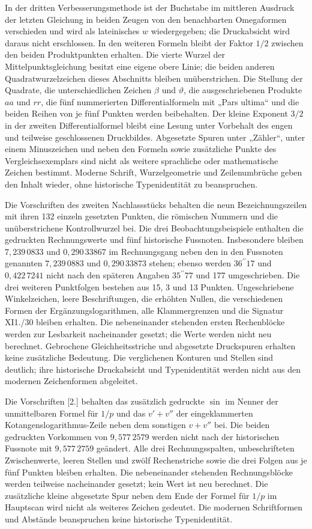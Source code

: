 In der dritten Verbesserungsmethode ist der Buchstabe im mittleren Ausdruck der letzten Gleichung in beiden Zeugen von den benachbarten Omegaformen verschieden und wird als lateinisches $w$ wiedergegeben; die Druckabsicht wird daraus nicht erschlossen. In den weiteren Formeln bleibt der Faktor $1/2$ zwischen den beiden Produktpunkten erhalten. Die vierte Wurzel der Mittelpunktsgleichung besitzt eine eigene obere Linie; die beiden anderen Quadratwurzelzeichen dieses Abschnitts bleiben unüberstrichen. Die Stellung der Quadrate, die unterschiedlichen Zeichen $\beta$ und $\vartheta$, die ausgeschriebenen Produkte $aa$ und $rr$, die fünf nummerierten Differentialformeln mit „Pars ultima“ und die beiden Reihen von je fünf Punkten werden beibehalten. Der kleine Exponent $3/2$ in der zweiten Differentialformel bleibt eine Lesung unter Vorbehalt des engen und teilweise geschlossenen Druckbildes. Abgesetzte Spuren unter „Zähler“, unter einem Minuszeichen und neben den Formeln sowie zusätzliche Punkte des Vergleichsexemplars sind nicht als weitere sprachliche oder mathematische Zeichen bestimmt. Moderne Schrift, Wurzelgeometrie und Zeilenumbrüche geben den Inhalt wieder, ohne historische Typenidentität zu beanspruchen.

Die Vorschriften des zweiten Nachlassstücks behalten die neun Bezeichnungszeilen mit ihren 132 einzeln gesetzten Punkten, die römischen Nummern und die unüberstrichene Kontrollwurzel bei. Die drei Beobachtungsbeispiele enthalten die gedruckten Rechnungswerte und fünf historische Fussnoten. Insbesondere bleiben $7{,}239\,0833$ und $0{,}290\,33867$ im Rechnungsgang neben den in den Fussnoten genannten $7{,}239\,0883$ und $0{,}290\,33873$ stehen; ebenso werden $36^{\prime\prime}17$ und $0{,}422\,7241$ nicht nach den späteren Angaben $35^{\prime\prime}77$ und 177 umgeschrieben. Die drei weiteren Punktfolgen bestehen aus 15, 3 und 13 Punkten. Ungeschriebene Winkelzeichen, leere Beschriftungen, die erhöhten Nullen, die verschiedenen Formen der Ergänzungslogarithmen, alle Klammergrenzen und die Signatur XI1./30 bleiben erhalten. Die nebeneinander stehenden ersten Rechenblöcke werden zur Lesbarkeit nacheinander gesetzt; die Werte werden nicht neu berechnet. Gebrochene Gleichheitsstriche und abgesetzte Druckspuren erhalten keine zusätzliche Bedeutung. Die verglichenen Konturen und Stellen sind deutlich; ihre historische Druckabsicht und Typenidentität werden nicht aus den modernen Zeichenformen abgeleitet.

Die Vorschriften [2.] behalten das zusätzlich gedruckte $\sin$ im Nenner der unmittelbaren Formel für $1/p$ und das $v' + v''$ der eingeklammerten Kotangenslogarithmus-Zeile neben dem sonstigen $v+v''$ bei. Die beiden gedruckten Vorkommen von $9{,}577\,2579$ werden nicht nach der historischen Fussnote mit $9{,}577\,2759$ geändert. Alle drei Rechnungsspalten, unbeschrifteten Zwischenwerte, leeren Stellen und zwölf Rechenstriche sowie die drei Folgen aus je fünf Punkten bleiben erhalten. Die nebeneinander stehenden Rechnungsblöcke werden teilweise nacheinander gesetzt; kein Wert ist neu berechnet. Die zusätzliche kleine abgesetzte Spur neben dem Ende der Formel für $1/p$ im Hauptscan wird nicht als weiteres Zeichen gedeutet. Die modernen Schriftformen und Abstände beanspruchen keine historische Typenidentität.

